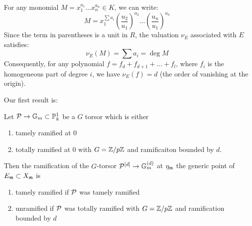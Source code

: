 For any monomial $M = x_1^{a_1} \dots x_n^{a_n} \in K$, we can write:
$$M = x_1^{\sum a_i} \left( \frac{u_2}{u_1} \right)^{a_2} \dots \left( \frac{u_n}{u_1} \right)^{a_n}$$
Since the term in parentheses is a unit in $R$, the valuation $\nu_E$ associated with $E$ satisfies:
$$\nu_E(M) = \sum a_i = \deg M$$
Consequently, for any polynomial $f = f_d + f_{d+1} + \dots + f_l$, where $f_i$ is the homogeneous part of degree $i$, we have $\nu_E(f) = d$ (the order of vanishing at the origin).



Our first result is:
\begin{theorem}\label{theorem:ramification_after_blowup_P1:reorg}
     Let $\mathcal{P} \to \mathbb{G}_m \subset \mathbb{P}_k^1$ be a $G$ torsor which is either
     \begin{enumerate}
          \item tamely ramified at $0$ 
          \item totally ramified at $0$ with $G=\mathbb{Z}/p\mathbb{Z}$ and ramificaiton bounded by $d$.
     \end{enumerate}
     Then the ramification of the $G$-torsor $\mathcal{P}^{[d]} \to \mathbb{G}_m^{(d)}$ at $\eta_{\mathfrak{m}}$ the generic point of $E_{\mathfrak{m}} \subset X_{\mathfrak{m}}$ is  
     \begin{enumerate}
          \item tamely ramified if $\mathcal{P}$ was tamely ramified
          \item unramified if $\mathcal{P}$ was totally ramified with $G=\mathbb{Z}/p\mathbb{Z}$ and ramification bounded by $d$
     \end{enumerate}
\end{theorem}
